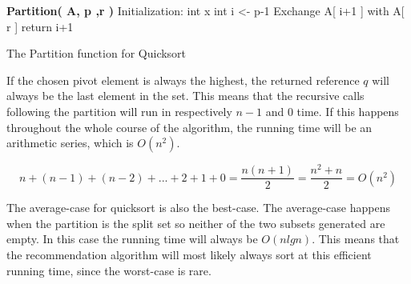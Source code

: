 \begin{algorithm}
	\DontPrintSemicolon
	\textbf{Partition( A, p ,r )}\;
	Initialization:\;
	int x\;
	int i <- p-1\;
	Exchange A[ i+1 ] with A[ r ]\;
	return i+1\;
	\caption{The Partition function for Quicksort}
	\label{Partition}
\end{algorithm}

If the chosen pivot element is always the highest, the returned reference $q$ will always be the last element in the set. This means that the recursive calls following the partition will run in respectively $n-1$ and $0$ time. If this happens throughout the whole course of the algorithm, the running time will be an arithmetic series\cite{AlgoAnal2},  which is $O(n^2)$.

\[
n + (n-1) + (n-2) + ... + 2 + 1 + 0 = \frac{n(n + 1)}{2}  = \frac{n^2 + n}{2} = O(n^2)
\]

The average-case for quicksort is also the best-case. The average-case happens when the partition is the split set so neither of the two subsets generated are empty. In this case the running time will always be $O(nlgn)$. This means that the recommendation algorithm will most likely always sort at this efficient running time, since the worst-case is rare.